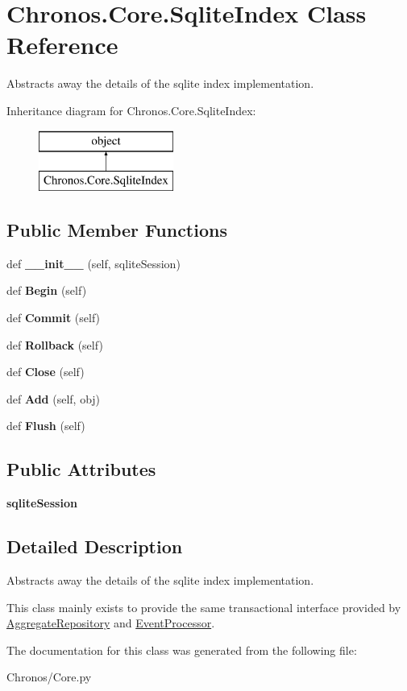 \hypertarget{classChronos_1_1Core_1_1SqliteIndex}{}\section{Chronos.\+Core.\+Sqlite\+Index Class Reference}
\label{classChronos_1_1Core_1_1SqliteIndex}


Abstracts away the details of the sqlite index implementation.  


Inheritance diagram for Chronos.\+Core.\+Sqlite\+Index\+:\begin{figure}[H]
\begin{center}
\leavevmode
\includegraphics[height=2.000000cm]{classChronos_1_1Core_1_1SqliteIndex}
\end{center}
\end{figure}
\subsection*{Public Member Functions}
\begin{DoxyCompactItemize}
\item 
def {\bfseries \+\_\+\+\_\+init\+\_\+\+\_\+} (self, sqlite\+Session)
\item 
def {\bfseries Begin} (self)
\item 
def {\bfseries Commit} (self)
\item 
def {\bfseries Rollback} (self)
\item 
def {\bfseries Close} (self)
\item 
def {\bfseries Add} (self, obj)
\item 
def {\bfseries Flush} (self)
\end{DoxyCompactItemize}
\subsection*{Public Attributes}
\begin{DoxyCompactItemize}
\item 
{\bfseries sqlite\+Session}
\end{DoxyCompactItemize}


\subsection{Detailed Description}
Abstracts away the details of the sqlite index implementation. 

This class mainly exists to provide the same transactional interface provided by \hyperlink{classChronos_1_1Core_1_1AggregateRepository}{Aggregate\+Repository} and \hyperlink{classChronos_1_1Core_1_1EventProcessor}{Event\+Processor}. 

The documentation for this class was generated from the following file\+:\begin{DoxyCompactItemize}
\item 
Chronos/Core.\+py\end{DoxyCompactItemize}
